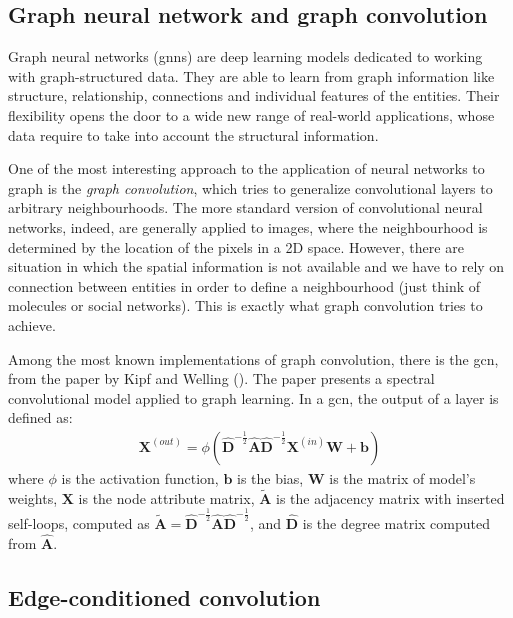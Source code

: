 \subsection{Graph neural network and graph convolution} Graph neural networks (\acsp{gnn}) are deep learning models dedicated to working with graph-structured data. They are able to learn from graph information like structure, relationship, connections and individual features of the entities. Their flexibility opens the door to a wide new range of real-world applications, whose data require to take into account the structural information.

One of the most interesting approach to the application of neural networks to graph is the \textit{graph convolution}, which tries to generalize convolutional layers to arbitrary neighbourhoods. The more standard version of convolutional neural networks, indeed, are generally applied to images, where the neighbourhood is determined by the location of the pixels in a 2D space. However, there are situation in which the spatial information is not available and we have to rely on connection between entities in order to define a neighbourhood (just think of molecules or social networks). This is exactly what graph convolution tries to achieve.

Among the most known implementations of graph convolution, there is the \acf{gcn}, from the paper by Kipf and Welling (\cite{arXiv:gcn}). The paper presents a spectral convolutional model applied to graph learning. In a \acs{gcn}, the output of a layer is defined as:
\begin{align}
    \mathbf{X}^{(out)}=\phi\left(\hat{\mathbf{D}}^{-\frac{1}{2}} \hat{\mathbf{A}} \hat{\mathbf{D}}^{-\frac{1}{2}} \mathbf{X}^{(in)} \mathbf{W} + \mathbf{b}\right)
\end{align}
where $\phi$ is the activation function, $\mathbf{b}$ is the bias, $\mathbf{W}$ is the matrix of model's weights, $\mathbf{X}$ is the node attribute matrix, $\tilde{\mathbf{A}}$ is the adjacency matrix with inserted self-loops, computed as $\tilde{\mathbf{A}} = \hat{\mathbf{D}}^{-\frac{1}{2}} \hat{\mathbf{A}} \hat{\mathbf{D}}^{-\frac{1}{2}}$, and $\hat{\mathbf{D}}$ is the degree matrix computed from $\hat{\mathbf{A}}$.

\subsection{Edge-conditioned convolution}
